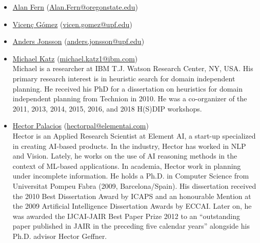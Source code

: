 \documentclass[10pt]{article}
\begin{document}
\begin{itemize}

\item \href{http://web.engr.oregonstate.edu/~afern/}{Alan Fern}
  (\href{mailto:Alan.Fern@oregonstate.edu}{Alan.Fern@oregonstate.edu})\\
  
\item \href{https://www.upf.edu/web/vgomez}{Vicen\c{c} G\'{o}mez}
  (\href{mailto:vicen.gomez@upf.edu}{vicen.gomez@upf.edu})\\

\item \href{https://www.upf.edu/web/anders-jonsson}{Anders Jonsson}
  (\href{mailto:anders.jonsson@upf.edu}{anders.jonsson@upf.edu})\\
    
\item \href{https://resedit.watson.ibm.com/researcher/view.php?person=ibm-Michael.Katz1}{Michael Katz}
 (\href{mailto:michael.katz1@ibm.com}{michael.katz1@ibm.com})\\
 Michael is a researcher at IBM T.J. Watson Research Center, NY, USA. His
 primary research interest is in heuristic search for domain independent planning.
 He received his PhD for a dissertation on heuristics for domain independent
 planning from Technion in 2010.
 He was a co-organizer of the 2011, 2013, 2014, 2015, 2016, and 2018 H(S)DIP
 workshops.

\item \href{http://hectorpalacios.net/}{Hector Palacios}
  (\href{mailto:hectorpal@elementai.com}{hectorpal@elementai.com})\\
Hector is an Applied Research Scientist at Element AI, a start-up specialized in
creating AI-based products. In the industry, Hector has worked in NLP and
Vision. Lately,  he works on the use of AI reasoning methods in the context of
ML-based applications. In academia, Hector work in planning under incomplete
information. He holds a Ph.D. in Computer Science from Universitat Pompeu Fabra
(2009, Barcelona/Spain). His dissertation received the 2010 Best Dissertation
Award by ICAPS and an honourable Mention at the 2009 Artificial Intelligence
Dissertation Awards by ECCAI. Later on, he was awarded the IJCAI-JAIR Best Paper
Prize 2012 to an “outstanding paper published in JAIR in the preceding five
calendar years” alongside his Ph.D. advisor Hector Geffner.   


\end{itemize}
\end{document}
